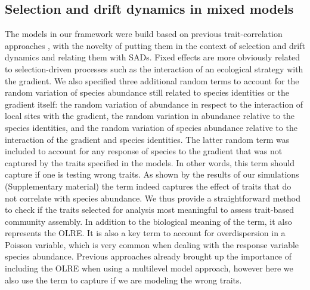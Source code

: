 \documentclass[12pt]{article}
\begin{document}

\subsection*{Selection and drift dynamics in mixed models }

The models in our framework were build based on previous
trait-correlation approaches \citep{Pollock2012, Jamil2013,
  Jamil2013a, Miller2019, TerBraak2019}, with the novelty of putting
them in the context of selection and drift dynamics
\citep[][\emph{sensu}]{Vellend2014} %
and relating them
with SADs. Fixed effects are more obviously related to
selection-driven processes such as the interaction of an ecological
strategy with the gradient. We also specified three additional random
terms to account for the random variation of species abundance still
related to species identities or the gradient itself: the random
variation of abundance in respect to the interaction of local sites
with the gradient, the random variation in abundance relative to the
species identities, and the random variation of species abundance
relative to the interaction of the gradient and species
identities. The latter random term was included to account for any
response of species to the gradient that was not captured by the
traits specified in the models. In other words, this term should
capture if one is testing wrong traits. As shown by the results of our
simulations (Supplementary material) the term indeed captures the
effect of traits that do not correlate with species abundance.
We thus provide a straightforward method to check if the traits
selected for analysis most meaningful to assess trait-based community
assembly. In addition to the biological meaning of the term, it also
represents the OLRE.  It is also a key term to account for
overdispersion in a Poisson variable, which is very common when
dealing with the response variable species abundance. Previous
approaches \citep{Miller2019, TerBraak2019} already brought up the
importance of including the OLRE when using a multilevel model
approach, however here we also use the term to capture if we are
modeling the wrong traits.
\end{document}

